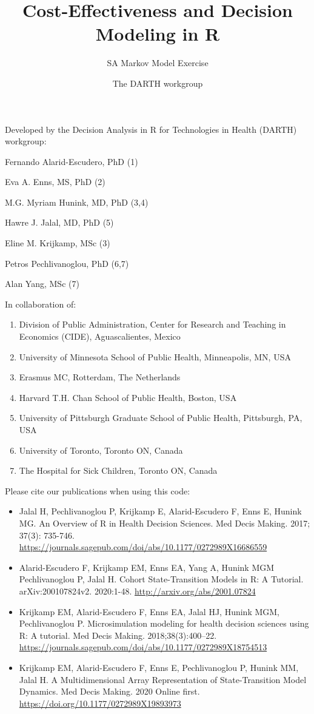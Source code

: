 \documentclass[]{article}
\title{Cost-Effectiveness and Decision Modeling in R}
\subtitle{SA Markov Model Exercise}
\author{The DARTH workgroup}
\date{}
\providecommand{\tightlist}{%
  \setlength{\itemsep}{0pt}\setlength{\parskip}{0pt}}
\begin{document}
\maketitle

Developed by the Decision Analysis in R for Technologies in Health
(DARTH) workgroup:

Fernando Alarid-Escudero, PhD (1)

Eva A. Enns, MS, PhD (2)

M.G. Myriam Hunink, MD, PhD (3,4)

Hawre J. Jalal, MD, PhD (5)

Eline M. Krijkamp, MSc (3)

Petros Pechlivanoglou, PhD (6,7)

Alan Yang, MSc (7)

In collaboration of:

\begin{enumerate}
\def\labelenumi{\arabic{enumi}.}
\tightlist
\item
  Division of Public Administration, Center for Research and Teaching in
  Economics (CIDE), Aguascalientes, Mexico
\item
  University of Minnesota School of Public Health, Minneapolis, MN, USA
\item
  Erasmus MC, Rotterdam, The Netherlands
\item
  Harvard T.H. Chan School of Public Health, Boston, USA
\item
  University of Pittsburgh Graduate School of Public Health, Pittsburgh,
  PA, USA
\item
  University of Toronto, Toronto ON, Canada
\item
  The Hospital for Sick Children, Toronto ON, Canada
\end{enumerate}

Please cite our publications when using this code:

\begin{itemize}
\item
  Jalal H, Pechlivanoglou P, Krijkamp E, Alarid-Escudero F, Enns E,
  Hunink MG. An Overview of R in Health Decision Sciences. Med Decis
  Making. 2017; 37(3): 735-746.
  \url{https://journals.sagepub.com/doi/abs/10.1177/0272989X16686559}
\item
  Alarid-Escudero F, Krijkamp EM, Enns EA, Yang A, Hunink MGM
  Pechlivanoglou P, Jalal H. Cohort State-Transition Models in R: A
  Tutorial. arXiv:200107824v2. 2020:1-48.
  \url{http://arxiv.org/abs/2001.07824}
\item
  Krijkamp EM, Alarid-Escudero F, Enns EA, Jalal HJ, Hunink MGM,
  Pechlivanoglou P. Microsimulation modeling for health decision
  sciences using R: A tutorial. Med Decis Making. 2018;38(3):400--22.
  \url{https://journals.sagepub.com/doi/abs/10.1177/0272989X18754513}
\item
  Krijkamp EM, Alarid-Escudero F, Enns E, Pechlivanoglou P, Hunink MM,
  Jalal H. A Multidimensional Array Representation of State-Transition
  Model Dynamics. Med Decis Making. 2020 Online first.
  \url{https://doi.org/10.1177/0272989X19893973}
\end{itemize}
\end{document}
